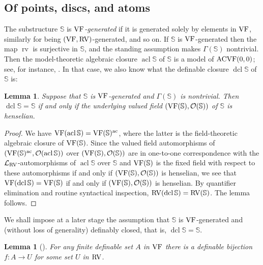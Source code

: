 \documentclass[12pt]{amsart}
\newcommand{\memph}[1]{{\color{magenta}\emph{#1}}}
\theoremstyle{plain}
\newtheorem{lem}[thm]{Lemma}
\theoremstyle{definition}
\theoremstyle{remark}
\numberwithin{equation}{section}
\theoremstyle{plain}
\newcommand{\VF}{\textup{VF}}
\newcommand{\ACVF}{\textup{ACVF}}
\newcommand{\RV}{\textup{RV}}
\newcommand{\OO}{\mdl O}
\DeclareMathOperator{\acl}{acl}
\DeclareMathOperator{\dcl}{dcl}
\DeclareMathOperator{\alg}{ac}
\newcommand{\0}{\emptyset}
\newcommand{\lan}[3]{\mathcal{L}_{#1 \textup{#2} #3}}
\newcommand{\mdl}[1]{\mathcal{#1}}  %
\newcommand{\bb}[1]{\mathbb{#1}}
\newcommand{\fun}{\longrightarrow}
\DeclareMathOperator{\rv}{rv}
\begin{document}
\subsection{Of points, discs, and atoms}
The substructure $\bb S$ is \memph{$\VF$-generated} if it is generated solely by elements in $\VF$, similarly for being $(\VF, \RV)$-generated, and so on. If $\bb S$ is $\VF$-generated then the map $\rv$ is surjective in $\bb S$, and the standing assumption makes $\Gamma(\mathbb S)$ nontrivial. Then the model-theoretic algebraic closure $\acl \mathbb{S}$ of $\mathbb{S}$ is a model of $\ACVF(0,0)$; see, for instance, \cite[Corollary~4.18]{Yin:QE:ACVF:min}. In that case, we also know what the definable closure $\dcl \mathbb{S}$ of $\mathbb{S}$ is:

\begin{lem}\label{cut:to:hensel:substru}
Suppose that $\mathbb{S}$ is $\VF$-generated and $\Gamma(\mathbb{S})$ is nontrivial. Then $\dcl \mathbb{S} = \mathbb{S}$ if and only if the underlying valued field $(\VF(\mathbb{S}), \OO(\mathbb{S}))$ of $\mathbb{S}$ is henselian.
\end{lem}
\begin{proof}
We have $\VF(\acl \mathbb{S}) = \VF(\mathbb{S})^{\alg}$, where the latter is the field-theoretic algebraic closure of $\VF(\mathbb{S})$. Since the valued field automorphisms of $(\VF(\mathbb{S})^{\alg}, \OO(\acl \mathbb{S}))$ over $(\VF(\mathbb{S}), \OO(\mathbb{S}))$ are in one-to-one correspondence with the $\lan{}{RV}{}$-automorphisms of $\acl \mathbb{S}$ over $\mathbb{S}$ and $\VF(\mathbb{S})$ is the fixed field with respect to these automorphisms if and only if $(\VF(\mathbb{S}), \OO(\mathbb{S}))$ is henselian, we see that $\VF (\dcl \mathbb{S}) = \VF(\mathbb{S})$ if and only if $(\VF(\mathbb{S}), \OO(\mathbb{S}))$ is henselian. By quantifier elimination and routine syntactical inspection, $\RV(\dcl \mathbb{S}) = \RV(\mathbb{S}) $.  The lemma follows.
\end{proof}

We shall impose at a later stage the assumption that $\mathbb{S}$ is $\VF$-generated and (without loss of generality) definably closed,  that is, $\dcl \mathbb{S} = \mathbb{S}$.

\begin{lem}[{\cite[Lemma~4.10]{Yin:QE:ACVF:min}}]\label{finite:VF:project:RV}
For any finite definable set $A$ in $\VF$ there is a definable bijection $f : A \fun U$ for some set $U$ in $\RV$.
\end{lem}
\end{document}

